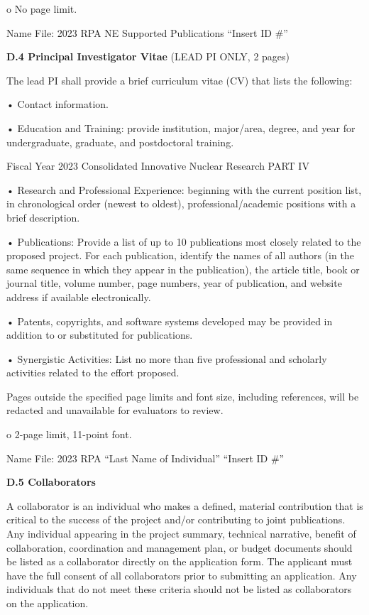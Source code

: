o No page limit.

Name File: 2023 RPA NE Supported Publications “Insert ID \#”

{\bf D.4 Principal Investigator Vitae} (LEAD PI ONLY, 2 pages)

The lead PI shall provide a brief curriculum vitae (CV) that lists the
following:

• Contact information.

• Education and Training: provide institution, major/area, degree, and year for
undergraduate, graduate, and postdoctoral training.

Fiscal Year 2023 Consolidated Innovative Nuclear Research PART IV

• Research and Professional Experience: beginning with the current position
list, in chronological order (newest to oldest), professional/academic
positions with a brief description.

• Publications: Provide a list of up to 10 publications most closely related to
the proposed project. For each publication, identify the names of all authors
(in the same sequence in which they appear in the publication), the article
title, book or journal title, volume number, page numbers, year of publication,
and website address if available electronically.

• Patents, copyrights, and software systems developed may be provided in
addition to or substituted for publications.

• Synergistic Activities: List no more than five professional and scholarly
activities related to the effort proposed.

Pages outside the specified page limits and font size, including references,
will be redacted and unavailable for evaluators to review.

o 2-page limit, 11-point font.

Name File: 2023 RPA “Last Name of Individual” “Insert ID \#”

{\bf D.5 Collaborators}

A collaborator is an individual who makes a defined, material contribution that
is critical to the success of the project and/or contributing to joint
publications. Any individual appearing in the project summary, technical
narrative, benefit of collaboration, coordination and management plan, or
budget documents should be listed as a collaborator directly on the application
form. The applicant must have the full consent of all collaborators prior to
submitting an application. Any individuals that do not meet these criteria
should not be listed as collaborators on the application.


